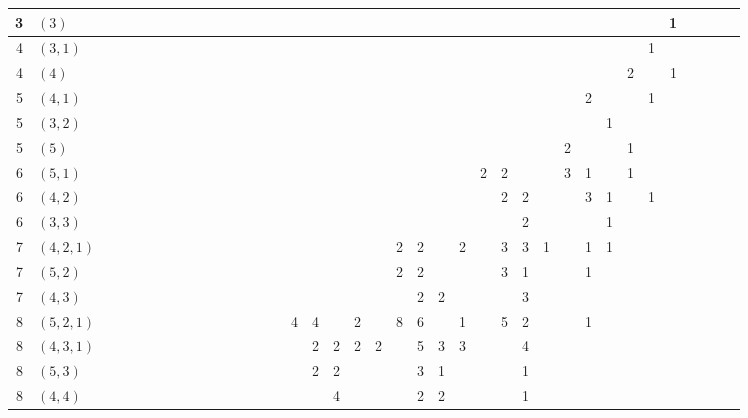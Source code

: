 \documentclass[a4paper]{amsart}
\theoremstyle{remark}
\numberwithin{equation}{section}
\begin{document}
\begin{minipage}{\linewidth}
\begin{center}
{\begin{tabular}{r|l|rrrrrrr|rrrrrr|rrrrr|rrrr|rrrr|rrr|rr|rr|r|r|r}
3 & $(3)$ &  &  &  &  &  &  &  &  &  &  &  &  &  &  &  &  &  &  &  &  &  &  &  &  &  &  &  &  &  &  &  & 1 &  &  &  &  \\
\midrule
4 & $(3,1)$ &  &  &  &  &  &  &  &  &  &  &  &  &  &  &  &  &  &  &  &  &  &  &  &  &  &  &  &  &  &  & 1 &  &  &  &  &  \\
4 & $(4)$ &  &  &  &  &  &  &  &  &  &  &  &  &  &  &  &  &  &  &  &  &  &  &  &  &  &  &  &  &  & 2 &  & 1 &  &  &  &  \\
\midrule
5 & $(4,1)$ &  &  &  &  &  &  &  &  &  &  &  &  &  &  &  &  &  &  &  &  &  &  &  &  &  &  &  & 2 &  &  & 1 &  &  &  &  &  \\
5 & $(3,2)$ &  &  &  &  &  &  &  &  &  &  &  &  &  &  &  &  &  &  &  &  &  &  &  &  &  &  &  &  & 1 &  &  &  &  &  &  &  \\
5 & $(5)$ &  &  &  &  &  &  &  &  &  &  &  &  &  &  &  &  &  &  &  &  &  &  &  &  &  &  & 2 &  &  & 1 &  &  &  &  &  &  \\
\midrule
6 & $(5,1)$ &  &  &  &  &  &  &  &  &  &  &  &  &  &  &  &  &  &  &  &  &  &  & 2 & 2 &  &  & 3 & 1 &  & 1 &  &  &  &  &  &  \\
6 & $(4,2)$ &  &  &  &  &  &  &  &  &  &  &  &  &  &  &  &  &  &  &  &  &  &  &  & 2 & 2 &  &  & 3 & 1 &  & 1 &  &  &  &  &  \\
6 & $(3,3)$ &  &  &  &  &  &  &  &  &  &  &  &  &  &  &  &  &  &  &  &  &  &  &  &  & 2 &  &  &  & 1 &  &  &  &  &  &  &  \\
\midrule
7 & $(4,2,1)$ &  &  &  &  &  &  &  &  &  &  &  &  &  &  &  &  &  &  & 2 & 2 &  & 2 &  & 3 & 3 & 1 &  & 1 & 1 &  &  &  &  &  &  &  \\
7 & $(5,2)$ &  &  &  &  &  &  &  &  &  &  &  &  &  &  &  &  &  &  & 2 & 2 &  &  &  & 3 & 1 &  &  & 1 &  &  &  &  &  &  &  &  \\
7 & $(4,3)$ &  &  &  &  &  &  &  &  &  &  &  &  &  &  &  &  &  &  &  & 2 & 2 &  &  &  & 3 &  &  &  &  &  &  &  &  &  &  &  \\
\midrule
8 & $(5,2,1)$ &  &  &  &  &  &  &  &  &  &  &  &  &  & 4 & 4 &  & 2 &  & 8 & 6 &  & 1 &  & 5 & 2 &  &  & 1 &  &  &  &  &  &  &  &  \\
8 & $(4,3,1)$ &  &  &  &  &  &  &  &  &  &  &  &  &  &  & 2 & 2 & 2 & 2 &  & 5 & 3 & 3 &  &  & 4 &  &  &  &  &  &  &  &  &  &  &  \\
8 & $(5,3)$ &  &  &  &  &  &  &  &  &  &  &  &  &  &  & 2 & 2 &  &  &  & 3 & 1 &  &  &  & 1 &  &  &  &  &  &  &  &  &  &  &  \\
8 & $(4,4)$ &  &  &  &  &  &  &  &  &  &  &  &  &  &  &  & 4 &  &  &  & 2 & 2 &  &  &  & 1 &  &  &  &  &  &  &  &  &  &  &  \\

\end{tabular}}
\end{center}
\end{minipage}
\end{document}
